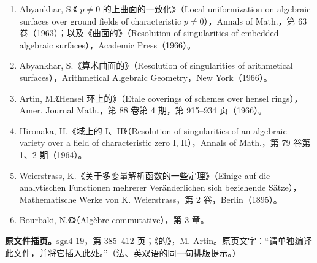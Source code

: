\begin{enumerate}
\item Abyankhar, S.《 $p\ne0$ 的上曲面的一致化》（Local uniformization on algebraic surfaces over ground fields of characteristic $p\ne0$），Annals of Math.，第 63 卷（1963）；以及《曲面的》（Resolution of singularities of embedded algebraic surfaces），Academic Press（1966）。
\item Abyankhar, S.《算术曲面的》（Resolution of singularities of arithmetical surfaces），Arithmetical Algebraic Geometry，New York（1966）。
\item Artin, M.《Hensel 环上的》（Etale coverings of schemes over hensel rings），Amer. Journal Math.，第 88 卷第 4 期，第 915--934 页（1966）。
\item Hironaka, H.《域上的 I、II》（Resolution of singularities of an algebraic variety over a field of characteristic zero I, II），Annals of Math.，第 79 卷第 1、2 期（1964）。
\item Weierstrass, K.《关于多变量解析函数的一些定理》（Einige auf die analytischen Functionen mehrerer Veränderlichen sich beziehende Sätze），Mathematische Werke von K. Weierstrass，第 2 卷，Berlin（1895）。
\item Bourbaki, N.《》（Algèbre commutative），第 3 章。
\end{enumerate}
\textbf{原文件插页。}$\mathrm{sga4\_19}$，第 385--412 页；《的》，M. Artin。原页文字：“请单独编译此文件，并将它插入此处。”（法、英双语的同一句排版提示。）

